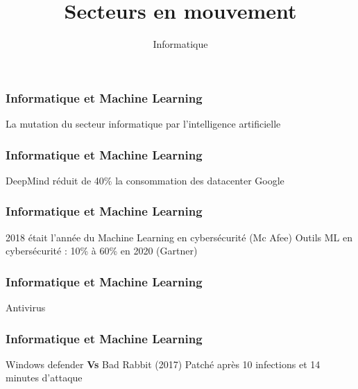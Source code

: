 \documentclass{formation}
\title{Secteurs en mouvement}
\subtitle{Informatique}
\begin{document}
\maketitle

\begin{frame}
  \frametitle{Informatique et Machine Learning}
  La mutation du secteur informatique par l'intelligence artificielle
\end{frame}

\begin{frame}
  \frametitle{Informatique et Machine Learning}
  DeepMind réduit de 40\% la consommation des datacenter Google
\end{frame}

\begin{frame}
  \frametitle{Informatique et Machine Learning}
  2018 était l'année du Machine Learning en cybersécurité (Mc Afee)
  \newline
  Outils ML en cybersécurité : 10\% à 60\% en 2020 (Gartner)
\end{frame}

\begin{frame}
  \frametitle{Informatique et Machine Learning}
  Antivirus 
  \newline
  \newline
  \begin{minipage}[c]{0.49\linewidth}
  \end{minipage}\hfill
  \begin{minipage}[c]{0.49\linewidth}
  \end{minipage}\hfill
\end{frame}

\begin{frame}
  \frametitle{Informatique et Machine Learning}
  Windows defender \textbf{Vs} Bad Rabbit (2017)
  \newline
  Patché après 10 infections et 14 minutes d'attaque
  \newline
  \newline
  \begin{minipage}[c]{0.49\linewidth}
  \end{minipage}\hfill
  \begin{minipage}[c]{0.49\linewidth}
  \end{minipage}\hfill
\end{frame}
\end{document}
